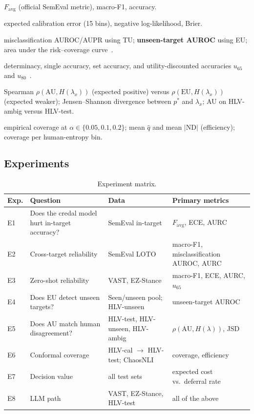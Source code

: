 \documentclass[11pt,a4paper]{article}
\newcommand{\AU}{\mathrm{AU}}
\newcommand{\EU}{\mathrm{EU}}
\newcommand{\ND}{\mathrm{ND}}
\begin{document}
\begin{description}[leftmargin=*, style=nextline]
  \item[Predictive quality] $F_{\text{avg}}$ (official SemEval metric), macro-F1, accuracy.
  \item[Calibration] expected calibration error (15 bins), negative log-likelihood, Brier.
  \item[Uncertainty quality] misclassification AUROC/AUPR using TU; \textbf{unseen-target
  AUROC} using EU; area under the risk--coverage curve~\cite{geifman2017}.
  \item[Set-valued prediction] determinacy, single accuracy, set accuracy, and
  utility-discounted accuracies $u_{65}$ and $u_{80}$~\cite{zaffalon2012}.
  \item[Human alignment] Spearman $\rho(\AU, H(\lambda_x))$ (expected positive) versus
  $\rho(\EU, H(\lambda_x))$ (expected weaker); Jensen--Shannon divergence between $p^{*}$ and
  $\lambda_x$; AU on HLV-ambig versus HLV-test.
  \item[Conformal validity] empirical coverage at $\alpha \in \{0.05, 0.1, 0.2\}$; mean
  $\hat q$ and mean $|\ND|$ (efficiency); coverage per human-entropy bin.
\end{description}

\subsection{Experiments}

\begin{table}[ht]
\centering
\small
\begin{tabular}{l p{5.0cm} p{3.6cm} p{3.6cm}}
\toprule
Exp. & Question & Data & Primary metrics \\
\midrule
E1 & Does the credal model hurt in-target accuracy? & SemEval in-target & $F_{\text{avg}}$, ECE, AURC \\
E2 & Cross-target reliability & SemEval LOTO & macro-F1, misclassification AUROC, AURC \\
E3 & Zero-shot reliability & VAST, EZ-Stance & macro-F1, ECE, AURC, $u_{65}$ \\
E4 & Does EU detect unseen targets? & Seen/unseen pool; HLV-unseen & unseen-target AUROC \\
E5 & Does AU match human disagreement? & HLV-test, HLV-unseen, HLV-ambig & $\rho(\AU, H(\lambda))$, JSD \\
E6 & Conformal coverage & HLV-cal $\to$ HLV-test; ChaosNLI & coverage, efficiency \\
E7 & Decision value & all test sets & expected cost vs.\ deferral rate \\
E8 & LLM path & VAST, EZ-Stance, HLV-test & all of the above \\
\bottomrule
\end{tabular}
\caption{Experiment matrix.}
\label{tab:exp}
\end{table}
\end{document}
